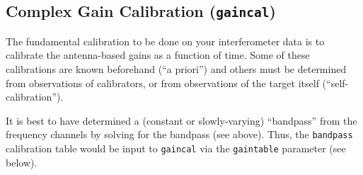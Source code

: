 \subsection{Complex Gain Calibration ({\tt gaincal})}
\label{section:cal.solve.gain}

The fundamental calibration to be done on your interferometer data
is to calibrate the antenna-based gains as a function of time. Some of
these calibrations are known beforehand (``a priori'') and others
must be determined from observations of calibrators, or from observations
of the target itself (``self-calibration'').

It is best to have determined a (constant or slowly-varying) ``bandpass'' from the
frequency channels by solving for the bandpass (see above).  Thus,
the {\tt bandpass} calibration table would be input to {\tt gaincal} via
the {\tt gaintable} parameter (see below).

